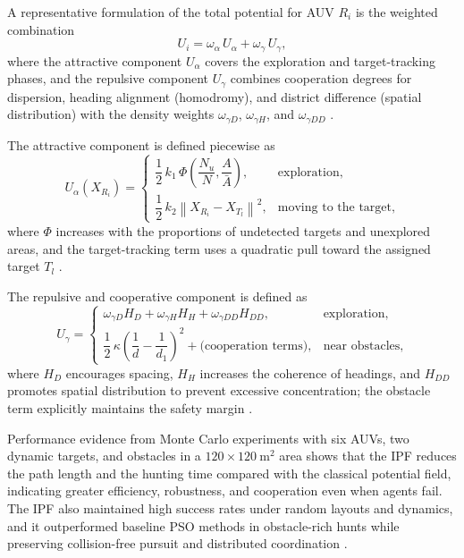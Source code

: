 A representative formulation of the total potential for AUV $R_i$ is the weighted
combination
\begin{equation}
  U_i = \omega_{\alpha}\,U_{\alpha} + \omega_{\gamma}\,U_{\gamma},
  \label{eq:ipf-total}
\end{equation}
where the attractive component $U_{\alpha}$ covers the exploration and
target-tracking phases, and the repulsive component $U_{\gamma}$ combines
cooperation degrees for dispersion, heading alignment (homodromy), and district
difference (spatial distribution) with the density weights $\omega_{\gamma D}$,
$\omega_{\gamma H}$, and $\omega_{\gamma DD}$ \cite{ge2018multi}.

The attractive component is defined piecewise as
\begin{equation}
  U_{\alpha}\left(X_{R_i}\right) =
  \begin{cases}
    \dfrac{1}{2}\,k_1\,\Phi\!\left(\dfrac{N_u}{N}, \dfrac{A}{\bar{A}}\right),
      & \text{exploration}, \\[2.5ex]
    \dfrac{1}{2}\,k_2 \left\| X_{R_i} - X_{T_l} \right\|^{2},
      & \text{moving to the target},
  \end{cases}
  \label{eq:ipf-attractive}
\end{equation}
where $\Phi$ increases with the proportions of undetected targets and unexplored
areas, and the target-tracking term uses a quadratic pull toward the assigned
target $T_l$ \cite{ge2018multi}.

The repulsive and cooperative component is defined as
\begin{equation}
  U_{\gamma} =
  \begin{cases}
    \omega_{\gamma D} H_D + \omega_{\gamma H} H_H + \omega_{\gamma DD} H_{DD},
      & \text{exploration}, \\[1.5ex]
    \dfrac{1}{2}\,\kappa \left(\dfrac{1}{d} - \dfrac{1}{d_1}\right)^{2}
      + \text{(cooperation terms)},
      & \text{near obstacles},
  \end{cases}
  \label{eq:ipf-repulsive}
\end{equation}
where $H_D$ encourages spacing, $H_H$ increases the coherence of headings, and
$H_{DD}$ promotes spatial distribution to prevent excessive concentration; the
obstacle term explicitly maintains the safety margin \cite{ge2018multi}.

Performance evidence from Monte Carlo experiments with six AUVs, two dynamic
targets, and obstacles in a $120 \times 120~\mathrm{m}^2$ area shows that the IPF
reduces the path length and the hunting time compared with the classical
potential field, indicating greater efficiency, robustness, and cooperation even
when agents fail. The IPF also maintained high success rates under random layouts
and dynamics, and it outperformed baseline PSO methods in obstacle-rich hunts
while preserving collision-free pursuit and distributed coordination \cite{ge2018multi}.

